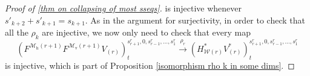 \documentclass[11pt]{amsart} \renewcommand{\baselinestretch}{1.4}
\theoremstyle{plain}
\theoremstyle{definition}
\renewcommand{\to}{\longrightarrow}
\newcommand{\calV}{\mathcal{V}}
\newcommand{\calw}{\mathcal{W}}
\newcommand{\calMv}{\mathcal{M}\dver}
\newcommand{\calMh}{\mathcal{M}\dhor}
\newcommand{\vect}[2]{\calV^{#1}_{#2}}
\newcommand{\UEAX}{\bar{X}'}%
\newcommand{\dver}{_\mathrm{v}}
\newcommand{\dhor}{_\mathrm{h}}
\newcommand{\Sqh}{\mathrm{Sq}\dhor}
\begin{document}
\begin{Calculations of HWn for n nonzero}
\begin{proof}[Proof of \ref{thm on collapsing of most sseqs}]
is injective whenever $s'_{k+2}+s'_{k+1}=s_{k+1}$. As in the argument for surjectivity, in order to check that all the $\rho_k$ are injective, we now only need to check that every map
\[(F^{\calMh(r+1)}F^{\calMv(r+1)}V_{(r)})^{s_{r+1}^{r},0,s_{r-1}^{r},\ldots,s_1^{r}}_{t} \overset{\rho_r}{\to}(H^*_{\calw(r)}V^*_{(r)})^{s_{r+1}^{r},0,s_{r-1}^{r},\ldots,s_1^{r}}_{t}\]
is injective, which is part of Proposition \ref{isomorphism rho k in some dims}.
%
\end{proof}

\end{Calculations of HWn for n nonzero}
\end{document}
